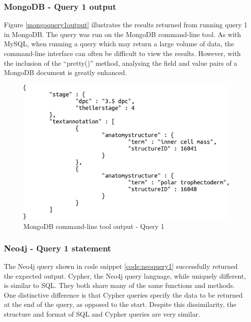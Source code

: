 \subsubsection*{MongoDB - Query 1 output}\label{mongoquery1output}
Figure \ref{mongoquery1output} illustrates the results returned from running query 1 in MongoDB. The query was run on the MongoDB command-line tool. As with MySQL, when running a query which may return a large volume of data, the command-line interface can often be difficult to view the results. However, with the inclusion of the ``pretty()'' method, analysing the field and value pairs of a MongoDB document is greatly enhanced.

\begin{figure}[H]\begin{center}\includegraphics[width=1\linewidth]{images/mongoquery1}\caption{MongoDB command-line tool output - Query 1}\label{fig:mongoquery1}\end{center}\end{figure}

\subsubsection*{Neo4j - Query 1 statement}\label{neoquery1statement}
The Neo4j query shown in code snippet \ref{code:neoquery1} successfully returned the expected output. Cypher, the Neo4j query language, while uniquely different, is similar to SQL. They both share many of the same functions and methods. One distinctive difference is that Cypher queries specify the data to be returned at the end of the query, as opposed to the start. Despite this dissimilarity, the structure and format of SQL and Cypher queries are very similar.

